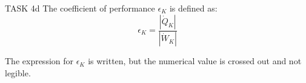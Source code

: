TASK 4d  
The coefficient of performance \( \epsilon_K \) is defined as:  
\[
\epsilon_K = \frac{|\dot{Q}_K|}{|\dot{W}_K|}
\]  

The expression for \( \epsilon_K \) is written, but the numerical value is crossed out and not legible.